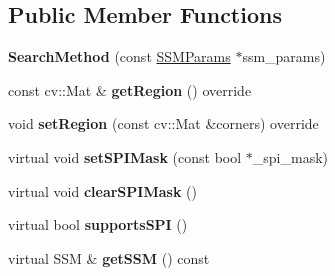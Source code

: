 \subsection*{Public Member Functions}
\begin{DoxyCompactItemize}
\item 
\hypertarget{classSearchMethod_3_01void_00_01SSM_01_4_a52be06926e22f2a6891f4122c6be32cd}{{\bfseries Search\-Method} (const \hyperlink{structSSMParams}{S\-S\-M\-Params} $\ast$ssm\-\_\-params)}\label{classSearchMethod_3_01void_00_01SSM_01_4_a52be06926e22f2a6891f4122c6be32cd}

\item 
\hypertarget{classSearchMethod_3_01void_00_01SSM_01_4_ac0369f0905c15f82b543071ef3a666c5}{const cv\-::\-Mat \& {\bfseries get\-Region} () override}\label{classSearchMethod_3_01void_00_01SSM_01_4_ac0369f0905c15f82b543071ef3a666c5}

\item 
\hypertarget{classSearchMethod_3_01void_00_01SSM_01_4_a0194ab41687d5c350129d1fd0304de69}{void {\bfseries set\-Region} (const cv\-::\-Mat \&corners) override}\label{classSearchMethod_3_01void_00_01SSM_01_4_a0194ab41687d5c350129d1fd0304de69}

\item 
\hypertarget{classSearchMethod_3_01void_00_01SSM_01_4_a20a0776a0708af6d4ba180f3d16f8e16}{virtual void {\bfseries set\-S\-P\-I\-Mask} (const bool $\ast$\-\_\-spi\-\_\-mask)}\label{classSearchMethod_3_01void_00_01SSM_01_4_a20a0776a0708af6d4ba180f3d16f8e16}

\item 
\hypertarget{classSearchMethod_3_01void_00_01SSM_01_4_ac30684f709ac9492c1939b8d795bb2ce}{virtual void {\bfseries clear\-S\-P\-I\-Mask} ()}\label{classSearchMethod_3_01void_00_01SSM_01_4_ac30684f709ac9492c1939b8d795bb2ce}

\item 
\hypertarget{classSearchMethod_3_01void_00_01SSM_01_4_a6caf2a09fafe6bb61d89553df054eef3}{virtual bool {\bfseries supports\-S\-P\-I} ()}\label{classSearchMethod_3_01void_00_01SSM_01_4_a6caf2a09fafe6bb61d89553df054eef3}

\item 
\hypertarget{classSearchMethod_3_01void_00_01SSM_01_4_ae4a8839d489d125d94abf0516ca3cdfe}{virtual S\-S\-M \& {\bfseries get\-S\-S\-M} () const }\label{classSearchMethod_3_01void_00_01SSM_01_4_ae4a8839d489d125d94abf0516ca3cdfe}

\end{DoxyCompactItemize}
